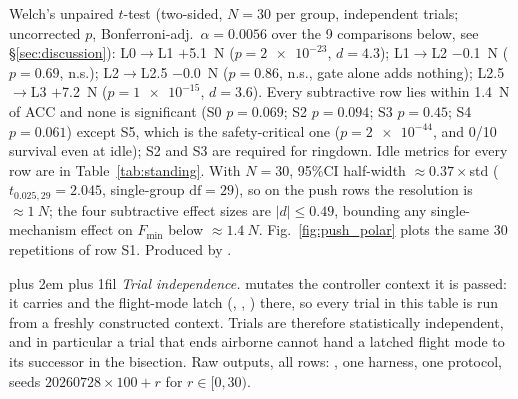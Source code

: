 \documentclass[conference]{IEEEtran}
\newcommand{\tabnote}{\par\leftskip=0pt\rightskip=0pt plus 2em%
  \parfillskip=0pt plus 1fil\relax}
\begin{document}
\begin{table}[!tbp]
Welch's unpaired $t$-test (two-sided, $N{=}30$ per group, independent trials; uncorrected $p$, Bonferroni-adj.\ $\alpha{=}0.0056$ over the \num{9} comparisons below, see \S\ref{sec:discussion}): L0$\rightarrow$L1 $+$\SI{5.1}{N} ($p{=}\num{2e-23}$, $d{=}4.3$); L1$\rightarrow$L2 $-$\SI{0.1}{N} ($p{=}0.69$, n.s.); L2$\rightarrow$L2.5 $-$\SI{0.0}{N} ($p{=}0.86$, n.s., gate alone adds nothing); L2.5$\rightarrow$L3 $+$\SI{7.2}{N} ($p{=}\num{1e-15}$, $d{=}3.6$). Every subtractive row lies within \SI{1.4}{N} of ACC and none is significant (S0 $p{=}0.069$; S2 $p{=}0.094$; S3 $p{=}0.45$; S4 $p{=}0.061$) except S5, which is the safety-critical one ($p{=}\num{2e-44}$, and \num{0}/\num{10} survival even at idle); S2 and S3 are required for ringdown. Idle metrics for every row are in Table~\ref{tab:standing}. With $N{=}30$, 95\%CI half-width ${\approx}0.37{\times}$std ($t_{0.025,29}{=}2.045$, single-group $\text{df}{=}29$), so on the push rows the resolution is ${\approx}\SI{1}{N}$; the four subtractive effect sizes are $|d|{\le}0.49$, bounding any single-mechanism effect on $F_{\min}$ below ${\approx}\SI{1.4}{N}$. Fig.~\ref{fig:push_polar} plots the same \num{30} repetitions of row S1. Produced by .\tabnote\noindent
\emph{Trial independence.}  mutates the controller context it is passed: it carries  and the flight-mode latch (, , ) there, so every trial in this table is run from a freshly constructed context. Trials are therefore statistically independent, and in particular a trial that ends airborne cannot hand a latched flight mode to its successor in the bisection. Raw outputs, all rows: , one harness, one protocol, seeds $\num{20260728}{\times}100+r$ for $r\in[0,30)$.
\end{table}
\end{document}
